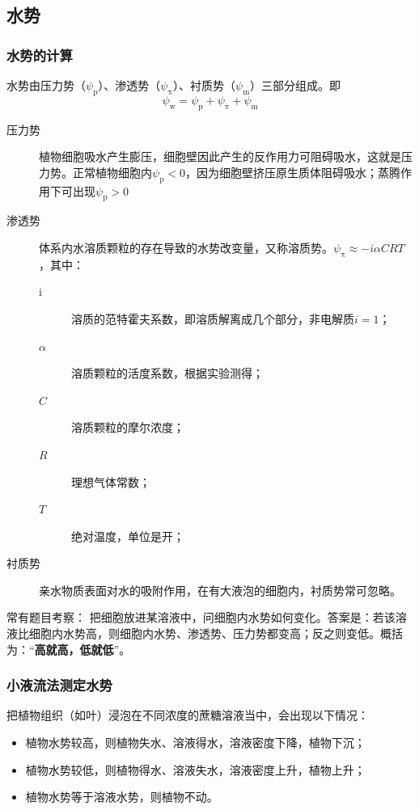 \subsection{水势}

\subsubsection{水势的计算}

水势由压力势（$\psi_{\text{p}}$）、渗透势（$\psi_{\uppi}$）、衬质势（$\psi_{\text{m}}$）三部分组成。即\[\psi_{\text{w}}=\psi_{\text{p}}+\psi_{\uppi}+\psi_{\text{m}}\]

\begin{description}
	\item[压力势] 植物细胞吸水产生膨压，细胞壁因此产生的反作用力可阻碍吸水，这就是压力势。正常植物细胞内$\psi_{\text{p}}<0$，因为细胞壁挤压原生质体阻碍吸水；蒸腾作用下可出现$\psi_{\text{p}}>0$
	\item[渗透势] 体系内水溶质颗粒的存在导致的水势改变量，又称溶质势。$\psi_{\uppi}\approx-i\alpha CRT$，其中：
	\begin{description}
		\item[i] 溶质的范特霍夫系数，即溶质解离成几个部分，非电解质$i=1$；
		\item[$\alpha$] 溶质颗粒的活度系数，根据实验测得；
		\item[$C$] 溶质颗粒的摩尔浓度；
		\item[$R$] 理想气体常数；
		\item[$T$] 绝对温度，单位是开；
	\end{description}
	\item[衬质势] 亲水物质表面对水的吸附作用，在有大液泡的细胞内，衬质势常可忽略。
\end{description}

\begin{qj}[：植物细胞水势变化]
	常有题目考察： 把细胞放进某溶液中，问细胞内水势如何变化。答案是：若该溶液比细胞内水势高，则细胞内水势、渗透势、压力势都变高；反之则变低。概括为：“\textbf{高就高，低就低}”。
\end{qj}

\subsubsection{小液流法测定水势}

把植物组织（如叶）浸泡在不同浓度的蔗糖溶液当中，会出现以下情况：
\begin{itemize}
	\item 植物水势较高，则植物失水、溶液得水，溶液密度下降，植物下沉；
	\item 植物水势较低，则植物得水、溶液失水，溶液密度上升，植物上升；
	\item 植物水势等于溶液水势，则植物不动。
\end{itemize}



